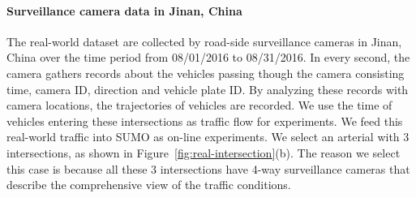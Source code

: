 


\paragraph{Surveillance camera data in Jinan, China}
The real-world dataset are collected by road-side surveillance cameras in Jinan, China over the time period from 08/01/2016 to 08/31/2016. In every second, the camera gathers records about the vehicles passing though the camera consisting time, camera ID, direction and vehicle plate ID. By analyzing these records with camera locations, the trajectories of vehicles are recorded.
We use the time of vehicles entering these intersections as traffic flow for experiments. We feed this real-world traffic into SUMO as on-line experiments. We select an arterial with 3 intersections, as shown in Figure~\ref{fig:real-intersection}(b). The reason we select this case is because all these 3 intersections have 4-way surveillance cameras that describe the comprehensive view of the traffic conditions.

